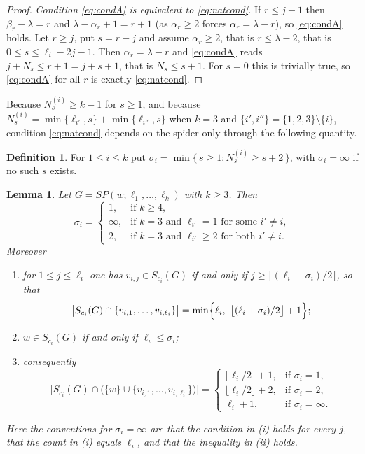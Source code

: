 \documentclass[reqno,10pt]{article}
\newtheorem{lemma}[theorem]{Lemma}
\theoremstyle{definition}
\newtheorem{definition}[theorem]{Definition}
\numberwithin{equation}{section}
\numberwithin{theorem}{section}
\begin{document}
\begin{proof}
\smallskip
\noindent\emph{Condition \eqref{eq:condA} is equivalent to \eqref{eq:natcond}.}
If $r\le j-1$ then $\beta_r-\lambda=r$ and $\lambda-\alpha_r+1=r+1$ (as
$\alpha_r\ge2$ forces $\alpha_r=\lambda-r$), so \eqref{eq:condA} holds. Let
$r\ge j$, put $s=r-j$ and assume $\alpha_r\ge2$, that is $r\le \lambda-2$, that
is $0\le s\le \ell_i-2j-1$. Then $\alpha_r=\lambda-r$ and \eqref{eq:condA}
reads $j+N_s\le r+1=j+s+1$, that is $N_s\le s+1$. For $s=0$ this is trivially
true, so \eqref{eq:condA} for all $r$ is exactly \eqref{eq:natcond}.
\end{proof}

Because $N^{(i)}_s\ge k-1$ for $s\ge1$, and because
$N^{(i)}_s=\min\{\ell_{i'},s\}+\min\{\ell_{i''},s\}$ when $k=3$ and
$\{i',i''\}=\{1,2,3\}\setminus\{i\}$, condition \eqref{eq:natcond} depends on
the spider only through the following quantity.

\begin{definition}
\label{def:sigma}
For $1\le i\le k$ put
$\sigma_i=\min\{\,s\ge1 : N^{(i)}_s\ge s+2\,\}$, with $\sigma_i=\infty$ if no
such $s$ exists.
\end{definition}

\begin{lemma}
\label{lem:sigma}
Let $G=SP(w;\ell_1,\dots,\ell_k)$ with $k\ge3$. Then
\[
  \sigma_i=
  \begin{cases}
    1, & \text{if } k\ge4,\\
    \infty, & \text{if } k=3 \text{ and } \ell_{i'}=1 \text{ for some } i'\ne i,\\
    2, & \text{if } k=3 \text{ and } \ell_{i'}\ge2 \text{ for both } i'\ne i .
  \end{cases}
\]
Moreover
\begin{enumerate}
\item[\textup{(i)}] for $1\le j\le\ell_i$ one has $v_{i,j}\in S_{c_i}(G)$ if and
only if $j\ge\bigl\lceil(\ell_i-\sigma_i)/2\bigr\rceil$, so that
\[
  \bigl|S_{c_i}(G)\cap\{v_{i,1},\dots,v_{i,\ell_i}\}\bigr|
  =\min\Bigl\{\ell_i,\ \bigl\lfloor(\ell_i+\sigma_i)/2\bigr\rfloor+1\Bigr\};
\]
\item[\textup{(ii)}] $w\in S_{c_i}(G)$ if and only if $\ell_i\le\sigma_i$;
\item[\textup{(iii)}] consequently
\[
  \bigl|S_{c_i}(G)\cap\bigl(\{w\}\cup\{v_{i,1},\dots,v_{i,\ell_i}\}\bigr)\bigr|=
  \begin{cases}
    \lceil \ell_i/2\rceil+1, & \text{if } \sigma_i=1,\\
    \lfloor \ell_i/2\rfloor+2, & \text{if } \sigma_i=2,\\
    \ell_i+1, & \text{if } \sigma_i=\infty .
  \end{cases}
\]
\end{enumerate}
Here the conventions for $\sigma_i=\infty$ are that the condition in
\textup{(i)} holds for every $j$, that the count in \textup{(i)} equals
$\ell_i$, and that the inequality in \textup{(ii)} holds.
\end{lemma}
\end{document}
